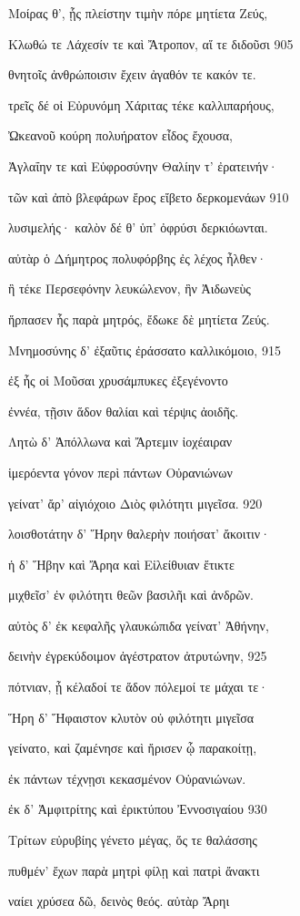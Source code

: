 Μοίρας θ', ᾗς πλείστην τιμὴν πόρε μητίετα Ζεύς, 

Κλωθώ τε Λάχεσίν τε καὶ Ἄτροπον, αἵ τε διδοῦσι \num{905} 

θνητοῖς ἀνθρώποισιν ἔχειν ἀγαθόν τε κακόν τε.

τρεῖς δέ οἱ Εὐρυνόμη Χάριτας τέκε καλλιπαρήους,

Ὠκεανοῦ κούρη πολυήρατον εἶδος ἔχουσα,

Ἀγλαΐην τε καὶ Εὐφροσύνην Θαλίην τ' ἐρατεινήν·

τῶν καὶ ἀπὸ βλεφάρων ἔρος εἴβετο δερκομενάων \num{910}

λυσιμελής· καλὸν δέ θ' ὑπ' ὀφρύσι δερκιόωνται. 

αὐτὰρ ὁ Δήμητρος πολυφόρβης ἐς λέχος ἦλθεν· 

ἣ τέκε Περσεφόνην λευκώλενον, ἣν Ἀιδωνεὺς

ἥρπασεν ἧς παρὰ μητρός, ἔδωκε δὲ μητίετα Ζεύς. 

Μνημοσύνης δ' ἐξαῦτις ἐράσσατο καλλικόμοιο, \num{915} 

ἐξ ἧς οἱ Μοῦσαι χρυσάμπυκες ἐξεγένοντο

ἐννέα, τῇσιν ἅδον θαλίαι καὶ τέρψις ἀοιδῆς.

Λητὼ δ' Ἀπόλλωνα καὶ Ἄρτεμιν ἰοχέαιραν 

ἱμερόεντα γόνον περὶ πάντων Οὐρανιώνων

γείνατ' ἄρ' αἰγιόχοιο Διὸς φιλότητι μιγεῖσα. \num{920}

λοισθοτάτην δ' Ἥρην θαλερὴν ποιήσατ' ἄκοιτιν· 

ἡ δ' Ἥβην καὶ Ἄρηα καὶ Εἰλείθυιαν ἔτικτε 

μιχθεῖσ' ἐν φιλότητι θεῶν βασιλῆι καὶ ἀνδρῶν. 

αὐτὸς δ' ἐκ κεφαλῆς γλαυκώπιδα γείνατ' Ἀθήνην, 

δεινὴν ἐγρεκύδοιμον ἀγέστρατον ἀτρυτώνην, \num{925} 

πότνιαν, ᾗ κέλαδοί τε ἅδον πόλεμοί τε μάχαι τε· 

Ἥρη δ' Ἥφαιστον κλυτὸν οὐ φιλότητι μιγεῖσα

γείνατο, καὶ ζαμένησε καὶ ἤρισεν ᾧ παρακοίτῃ,

ἐκ πάντων τέχνῃσι κεκασμένον Οὐρανιώνων.

ἐκ δ' Ἀμφιτρίτης καὶ ἐρικτύπου Ἐννοσιγαίου \num{930}

Τρίτων εὐρυβίης γένετο μέγας, ὅς τε θαλάσσης 

πυθμέν' ἔχων παρὰ μητρὶ φίλῃ καὶ πατρὶ ἄνακτι

ναίει χρύσεα δῶ, δεινὸς θεός. αὐτὰρ Ἄρηι

